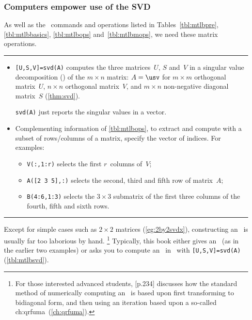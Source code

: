\subsubsection{Computers empower use of the SVD}

\begin{table}
\caption{As well as the \script\ commands and operations listed in Tables~\ref{tbl:mtlbpre}, \ref{tbl:mtlbbasics}, \ref{tbl:mtlbops} and~\ref{tbl:mtlbmops},  we need these matrix operations.} \label{tbl:mtlbsvd}
\hrule
\begin{minipage}{\linewidth}
\begin{itemize}
\item {}\verb|[U,S,V]=svd(A)| computes the three matrices~\(U\), \(S\) and~\(V\) in a singular value decomposition (\svd) of the \(m\times n\) matrix: \(A=\usv\) for \(m\times m\) orthogonal matrix~\(U\), \(n\times n\) orthogonal matrix~\(V\), and \(m\times n\) non-negative diagonal matrix~\(S\) (\autoref{thm:svd}).

\verb|svd(A)| just reports the singular values in a vector.

\item Complementing information of \autoref{tbl:mtlbops}, to extract and compute with a subset of rows\slash columns of a matrix, specify the vector of indices.
For examples:
\begin{itemize}
\item \verb|V(:,1:r)| selects the first \(r\)~columns of~\(V\);
\item \verb|A([2 3 5],:)| selects the second, third and fifth row of matrix~\(A\);
\item \verb|B(4:6,1:3)| selects the \(3\times 3\) submatrix of the first three columns of the fourth, fifth and sixth rows.
\end{itemize}

\end{itemize}
\end{minipage}
\hrule
\end{table}




Except for simple cases such as \(2\times 2\) matrices (\autoref{eg:2by2svdx}), constructing an \svd\ is usually far too laborious by hand.  
\footnote{For those interested advanced students, \cite{Trefethen1997} [p.234] discusses how the standard method of numerically computing an \svd\ is based upon first transforming to bidiagonal form, and then using an iteration based upon a so-called  \ifcsname ch:qrfuma\endcsname\ (\autoref{ch:qrfuma})\fi.}
Typically, this book either gives an \svd\ (as in the earlier two examples) or asks you to compute an \svd\ in \script\ with \verb|[U,S,V]=svd(A)| (\autoref{tbl:mtlbsvd}).

